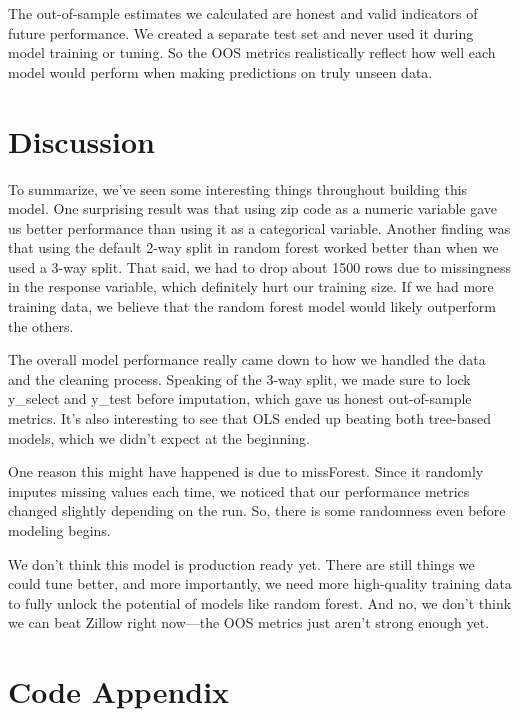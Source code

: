 \documentclass[12pt]{article}
\begin{document}
The out-of-sample estimates we calculated are honest and valid indicators of future performance. We created a separate test set and never used it during model training or tuning. So the OOS metrics realistically reflect how well each model would perform when making predictions on truly unseen data. 

\section{Discussion}

To summarize, we’ve seen some interesting things throughout building this model. One surprising result was that using zip code as a numeric variable gave us better performance than using it as a categorical variable. Another finding was that using the default 2-way split in random forest worked better than when we used a 3-way split. That said, we had to drop about 1500 rows due to missingness in the response variable, which definitely hurt our training size. If we had more training data, we believe that the random forest model would likely outperform the others.

The overall model performance really came down to how we handled the data and the cleaning process. Speaking of the 3-way split, we made sure to lock y\_select and y\_test before imputation, which gave us honest out-of-sample metrics. It’s also interesting to see that OLS ended up beating both tree-based models, which we didn’t expect at the beginning.

One reason this might have happened is due to missForest. Since it randomly imputes missing values each time, we noticed that our performance metrics changed slightly depending on the run. So, there is some randomness even before modeling begins.

We don’t think this model is production ready yet. There are still things we could tune better, and more importantly, we need more high-quality training data to fully unlock the potential of models like random forest. And no, we don’t think we can beat Zillow right now—the OOS metrics just aren’t strong enough yet.


\section*{Code Appendix}
  \inputminted[bgcolor=lightgray]{r}{./final_project.Rmd}
\end{document}
